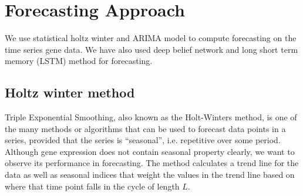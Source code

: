 \section{Forecasting Approach}
\label{sec:forecast}
We use statistical holtz winter and ARIMA model to compute forecasting on the time series gene data. We have also used deep belief network and long short term memory (LSTM) method for forecasting.


\subsection{Holtz winter method}
Triple Exponential Smoothing, also known as the Holt-Winters method, is one of the many methods or algorithms that can be used to forecast data points in a series, provided that the series is “seasonal”, i.e. repetitive over some period. Although gene expression does not contain seasonal property clearly, we want to observe its performance in forecasting.
The method calculates a trend line for the data as well as seasonal indices that weight the values in the trend line based on where that time point falls in the cycle of length $L$.

